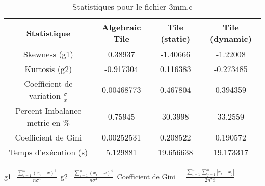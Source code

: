 \documentclass{article}
\begin{document}
\begin{table}[htbp]
  \centering
  \caption{Statistiques pour le fichier 3mm.c}
  \begin{tabular}{|c|c|c|c|}
    \hline
    Statistique & Algebraic Tile & Tile (static) & Tile (dynamic) \\ 
    \hline
    Skewness (g1)  & 0.38937 & -1.40666 & -1.22008 \\ 
    Kurtosis (g2)  & -0.917304 & 0.116383 & -0.273485 \\ 
    Coefficient de variation $ \frac{\sigma}{\overline{x}} $ & 0.00468773 & 0.467804 & 0.394359\\ 
    Percent Imbalance metric en \% & 0.75945 & 30.3998 & 33.2559\\ 
    Coefficient de Gini  & 0.00252531 & 0.208522 & 0.190572\\ 
    Temps d'exécution (s) &  5.129881    &  19.656638   &  19.173317   \\ 

    \hline
  \end{tabular}
\end{table}
g1=$ \frac{\sum_{i=1}^{n} (x_i - \overline{x})^3}{n\sigma^3} $\
g2=$ \frac{\sum_{i=1}^{n} (x_i - \overline{x})^4}{n\sigma^4} $\
Coefficient de Gini = $ \frac{\sum_{i=1}^{n}\sum_{j=1}^{n} |x_i - x_j|}{2n^2\overline{x}} $\
\newpage
\end{document}
